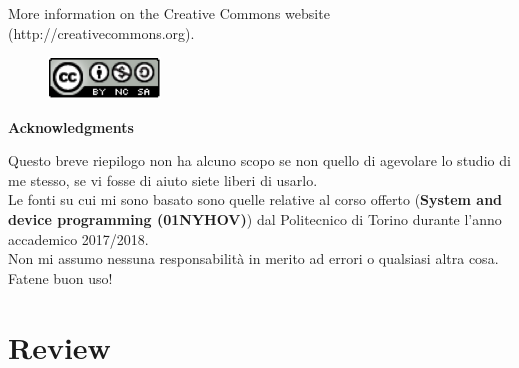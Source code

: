 \documentclass[12pt]{article}
\begin{document}
\noindent More information on the Creative Commons website (http://creativecommons.org).

\begin{figure}[h!]
  \centering
  \includegraphics[width=3cm]{images/license.png}
\end{figure}

{\noindent \Large \textbf{Acknowledgments}\bigskip}

Questo breve riepilogo non ha alcuno scopo se non quello di agevolare lo studio di me stesso, se vi fosse di aiuto siete liberi di usarlo.\\
Le fonti su cui mi sono basato sono quelle relative al corso offerto (\textbf{System and device programming (01NYHOV)}) dal Politecnico di Torino durante l'anno accademico 2017/2018.\\
Non mi assumo nessuna responsabilità in merito ad errori o qualsiasi altra cosa. Fatene buon uso!
\newpage


\section{Review}
\end{document}
